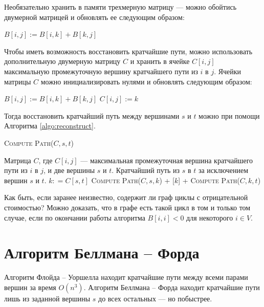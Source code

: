 \documentclass[a4paper,12pt]{article}
\newcommand{\algname}[1]{\textsc{#1}}
\begin{document}
Необязательно хранить в памяти трехмерную матрицу --- можно обойтись двумерной матрицей и обновлять ее следующим образом:
\begin{center}
	\begin{algorithmic}%
						\State $B[i, j] := B[i, k] + B[k, j]$
					\EndIf
	\end{algorithmic}
\end{center}
Чтобы иметь возможность восстановить кратчайшие пути, можно использовать дополнительную двумерную матрицу $C$ и хранить в ячейке $C[i, j]$ максимальную промежуточную вершину кратчайшего пути из $i$ в $j$. Ячейки матрицы $C$ можно инициализировать нулями и обновлять следующим образом:
\begin{center}
	\begin{algorithmic}%
						\State $B[i, j] := B[i, k] + B[k, j]$
						\State $C[i, j] := k$
					\EndIf
	\end{algorithmic}
\end{center}
Тогда восстановить кратчайший путь между вершинами $s$ и $t$ можно при помощи Алгоритма \ref{algo:reconstruct}.
\begin{algorithm}
  	\caption{\algname{Compute Path}($C, s, t$)}
	\label{algo:reconstruct}
	\begin{algorithmic}%
		\Require Матрица $C$, где $C[i, j]$ --- максимальная промежуточная вершина кратчайшего пути из $i$ в $j$, и две вершины $s$ и $t$.
		\Ensure Кратчайший путь из $s$ в $t$ за исключением вершин $s$ и $t$.
		\State
		\State $k: = C[s, t]$
			\Return []
		\EndIf
		\Return \algname{Compute Path}($C, s, k$) + [$k$] + \algname{Compute Path}($C, k, t$)
	\end{algorithmic}
\end{algorithm}

Как быть, если заранее неизвестно, содержит ли граф циклы с отрицательной стоимостью? Можно доказать, что в графе есть такой цикл в том и только том случае, если по окончании работы алгоритма $B[i, i] < 0$ для некоторого $i \in V$.
\newpage
\section{Алгоритм Беллмана -- Форда}
Алгоритм Флойда -- Уоршелла находит кратчайшие пути между всеми парами вершин за время $O(n^3)$. Алгоритм Беллмана -- Форда находит кратчайшие пути лишь из заданной вершины $s$ до всех остальных --- но побыстрее.
\end{document}
